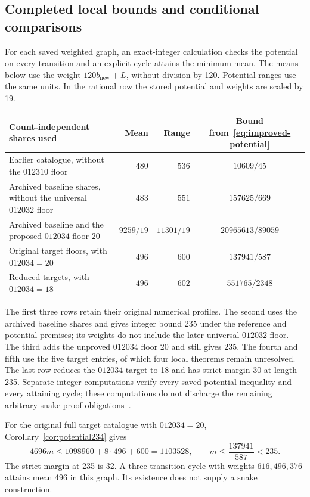 \documentclass[11pt,a4paper]{article}
\theoremstyle{definition}
\theoremstyle{remark}
\begin{document}
\subsection{Completed local bounds and conditional comparisons}
For each saved weighted graph, an exact-integer calculation checks the
potential on every transition and an explicit cycle attains the minimum mean. The means below use the weight
$120b_{\mathrm{new}}+L$, without division by 120. Potential ranges use the same
units. In the rational row the stored potential and weights are scaled by 19.
\begin{center}\small
\begin{tabular}{p{}r r c}
\toprule
Count-independent shares used & Mean & Range & Bound from~\eqref{eq:improved-potential}\\\midrule
Earlier catalogue, without the $012310$ floor & $480$ & $536$ & $10609/45$\\
Archived baseline shares, without the universal $012032$ floor & $483$ & $551$ & $157625/669$\\
Archived baseline and the proposed $012034$ floor 20 & $9259/19$ & $11301/19$ & $20965613/89059$\\
Original target floors, with $012034=20$ & $496$ & $600$ & $137941/587$\\
Reduced targets, with $012034=18$ & $496$ & $602$ & $551765/2348$\\
\bottomrule
\end{tabular}
\end{center}
The first three rows retain their original numerical profiles. The second
uses the archived baseline shares and gives integer bound 235 under the
reference and potential premises; its weights do not include the later
universal $012032$ floor. The third adds the unproved $012034$ floor 20
and still gives 235. The fourth and fifth use the five target entries,
of which four local theorems remain unresolved. The last row reduces the
$012034$ target to 18 and has strict margin 30 at length 235. Separate integer computations verify every saved potential
inequality and every attaining cycle; these computations do not discharge the
remaining arbitrary-snake proof obligations~\cite{countfreearchive,shareclosurearchive,targetsharearchive}.

For the original full target catalogue with $012034=20$, Corollary~\ref{cor:potential234} gives
\[
4696m\le1098960+8\cdot496+600=1103528,
\qquad m\le\frac{137941}{587}<235.
\]
The strict margin at 235 is 32. A three-transition cycle with weights
$616,496,376$ attains mean 496 in this graph. Its existence does not supply
a snake construction.
\end{document}
